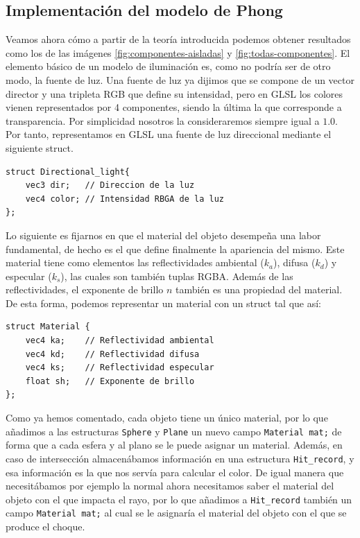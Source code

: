 \subsection{Implementación del modelo de Phong}

Veamos ahora cómo a partir de la teoría introducida podemos obtener resultados como los de las imágenes \ref{fig:componentes-aisladas} y \ref{fig:todas-componentes}. El elemento básico de un modelo de iluminación es, como no podría ser de otro modo, la fuente de luz. Una fuente de luz ya dijimos que se compone de un vector director y una tripleta RGB que define su intensidad, pero en GLSL los colores vienen representados por 4 componentes, siendo la última la que corresponde a transparencia. Por simplicidad nosotros la consideraremos siempre igual a $1.0$. Por tanto, representamos en GLSL una fuente de luz direccional mediante el siguiente struct.
\begin{lstlisting}
struct Directional_light{
    vec3 dir;   // Direccion de la luz
    vec4 color; // Intensidad RBGA de la luz
};    
\end{lstlisting}

Lo siguiente es fijarnos en que el material del objeto desempeña una labor fundamental, de hecho es el que define finalmente la apariencia del mismo. Este material tiene como elementos las reflectividades ambiental ($k_a$), difusa ($k_d$) y especular ($k_s$), las cuales son también tuplas RGBA. Además de las reflectividades, el exponente de brillo $n$ también es una propiedad del material. De esta forma, podemos representar un material con un struct tal que así:

\begin{lstlisting}
struct Material {
    vec4 ka;    // Reflectividad ambiental
    vec4 kd;    // Reflectividad difusa
    vec4 ks;    // Reflectividad especular
    float sh;   // Exponente de brillo
};
\end{lstlisting}

Como ya hemos comentado, cada objeto tiene un único material, por lo que añadimos a las estructuras \verb|Sphere| y \verb|Plane| un nuevo campo \verb|Material mat;| de forma que a cada esfera y al plano se le puede asignar un material. Además, en caso de intersección almacenábamos información en una estructura \verb|Hit_record|, y esa información es la que nos servía para calcular el color. De igual manera que necesitábamos por ejemplo la normal ahora necesitamos saber el material del objeto con el que impacta el rayo, por lo que añadimos a \verb|Hit_record| también un campo \verb|Material mat;| al cual se le asignaría el material del objeto con el que se produce el choque.

